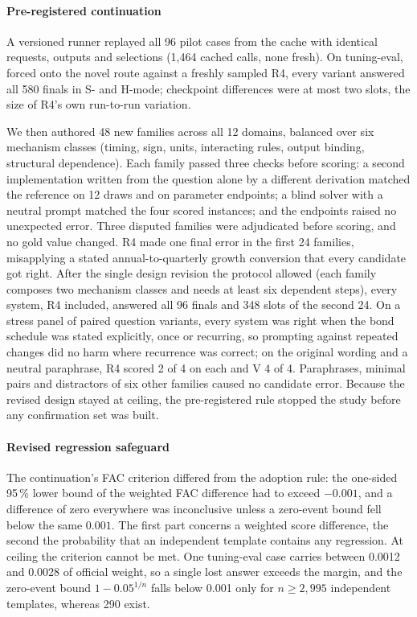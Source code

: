 \documentclass[conference]{IEEEtran}
\begin{document}
\paragraph*{Pre-registered continuation} A versioned runner replayed all 96 pilot cases from the cache with identical requests, outputs and selections (1,464 cached calls, none fresh). On tuning-eval, forced onto the novel route against a freshly sampled R4, every variant answered all 580 finals in S- and H-mode; checkpoint differences were at most two slots, the size of R4's own run-to-run variation.

We then authored 48 new families across all 12 domains, balanced over six mechanism classes (timing, sign, units, interacting rules, output binding, structural dependence). Each family passed three checks before scoring: a second implementation written from the question alone by a different derivation matched the reference on 12 draws and on parameter endpoints; a blind solver with a neutral prompt matched the four scored instances; and the endpoints raised no unexpected error. Three disputed families were adjudicated before scoring, and no gold value changed. R4 made one final error in the first 24 families, misapplying a stated annual-to-quarterly growth conversion that every candidate got right. After the single design revision the protocol allowed (each family composes two mechanism classes and needs at least six dependent steps), every system, R4 included, answered all 96 finals and 348 slots of the second 24. On a stress panel of paired question variants, every system was right when the bond schedule was stated explicitly, once or recurring, so prompting against repeated changes did no harm where recurrence was correct; on the original wording and a neutral paraphrase, R4 scored 2 of 4 on each and V 4 of 4. Paraphrases, minimal pairs and distractors of six other families caused no candidate error. Because the revised design stayed at ceiling, the pre-registered rule stopped the study before any confirmation set was built.

\paragraph*{Revised regression safeguard} The continuation's FAC criterion differed from the adoption rule: the one-sided 95\,\% lower bound of the weighted FAC difference had to exceed $-0.001$, and a difference of zero everywhere was inconclusive unless a zero-event bound fell below the same $0.001$. The first part concerns a weighted score difference, the second the probability that an independent template contains any regression. At ceiling the criterion cannot be met. One tuning-eval case carries between 0.0012 and 0.0028 of official weight, so a single lost answer exceeds the margin, and the zero-event bound $1-0.05^{1/n}$ falls below 0.001 only for $n\ge2{,}995$ independent templates, whereas 290 exist.
\end{document}
